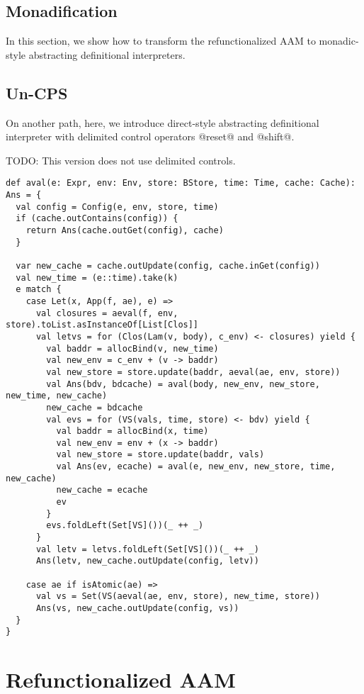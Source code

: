 \documentclass[acmsmall,review,anonymous]{acmart}\settopmatter{printfolios=true,printccs=false,printacmref=false}
\begin{document}
\subsection{Monadification} \label{monadify}

In this section, we show how to transform the refunctionalized AAM to monadic-style
abstracting definitional interpreters.

\subsection{Un-CPS} \label{uncps}

On another path, here, we introduce direct-style abstracting definitional interpreter 
with delimited control operators @reset@ and @shift@.

TODO: This version does not use delimited controls.

\begin{lstlisting}
def aval(e: Expr, env: Env, store: BStore, time: Time, cache: Cache): Ans = {
  val config = Config(e, env, store, time)
  if (cache.outContains(config)) {
    return Ans(cache.outGet(config), cache)
  }

  var new_cache = cache.outUpdate(config, cache.inGet(config))
  val new_time = (e::time).take(k)
  e match {
    case Let(x, App(f, ae), e) =>
      val closures = aeval(f, env, store).toList.asInstanceOf[List[Clos]]
      val letvs = for (Clos(Lam(v, body), c_env) <- closures) yield {
        val baddr = allocBind(v, new_time)
        val new_env = c_env + (v -> baddr)
        val new_store = store.update(baddr, aeval(ae, env, store))
        val Ans(bdv, bdcache) = aval(body, new_env, new_store, new_time, new_cache)
        new_cache = bdcache
        val evs = for (VS(vals, time, store) <- bdv) yield {
          val baddr = allocBind(x, time)
          val new_env = env + (x -> baddr)
          val new_store = store.update(baddr, vals)
          val Ans(ev, ecache) = aval(e, new_env, new_store, time, new_cache)
          new_cache = ecache
          ev
        }
        evs.foldLeft(Set[VS]())(_ ++ _)
      }
      val letv = letvs.foldLeft(Set[VS]())(_ ++ _)
      Ans(letv, new_cache.outUpdate(config, letv))

    case ae if isAtomic(ae) =>
      val vs = Set(VS(aeval(ae, env, store), new_time, store))
      Ans(vs, new_cache.outUpdate(config, vs))
  }
}
\end{lstlisting}

\section{Refunctionalized AAM}
\end{document}

